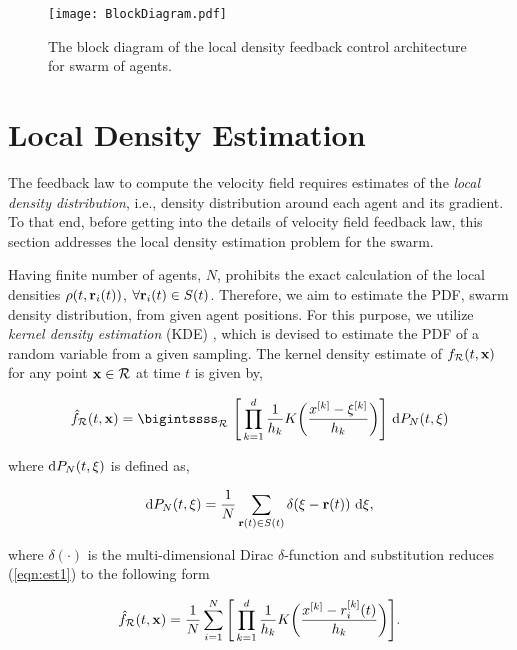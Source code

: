 \documentclass{ifacconf}
\newcommand{\Rconf}{{\mathcal R}}
\newcommand{\bx}{{\bf x}}
\newcommand{\br}{{\bf r}}
\begin{document}
\begin{figure}[hbt!]
\centering
\texttt{[image: BlockDiagram.pdf]}
\caption{The block diagram of the local density feedback control architecture for swarm of agents.} 
\label{fig: blockdiagfeedback}
\end{figure}


\section{Local Density Estimation}%
The feedback  law to compute the velocity field requires  estimates of the \emph{local density distribution}, i.e., density distribution around each agent and its gradient.  To that end, before getting into the details of velocity field feedback law, this section addresses the local density estimation problem for the swarm. 

Having finite number of agents, $N$, prohibits the exact calculation of the local densities $\rho(t,\br_i(t))$, $\forall\br_i(t) \in S(t)$. Therefore, we aim to estimate the PDF, swarm density distribution, from given agent positions. For this purpose, we utilize   \emph{kernel density estimation} (KDE) \cite{rosenblatt1956remarks,parzen1962estimation}, which is devised to estimate the PDF of a random variable from a given sampling. The kernel density estimate of $f_\Rconf(t,\bx)$ for any point $\bx \in \Rconf$ at time $t$ is given by, 

\begin{equation}\label{eqn:est1}
	\hat{f}_\Rconf(t,\bx) = \bigintssss_{\Rconf} \ \Bigg[ \prod_{k=1}^{d} \frac{1}{h_k}K\bigg(\frac{x^{[k]}-\xi^{[k]}}{h_k}\bigg) \Bigg] \ \textnormal{d}P_N(t,\textbf{$\xi$})
\end{equation}

where $\textnormal{d}P_N(t,\textbf{$\xi$})$  is defined as,

\begin{equation*}
	\textnormal{d}P_N(t,\textbf{$\xi$}) = \frac{1}{N}\sum_{\br(t) \in S(t)} \delta(\textbf{$\xi$}-\br (t)) \ \textnormal{d}\xi,
\end{equation*}

where $\delta(\cdot)$ is the multi-dimensional Dirac $\delta$-function and substitution reduces (\ref{eqn:est1}) to the following form

\begin{equation} \label{eqn:f_estimator}
	\hat{f}_\Rconf (t,\bx) = \frac{1}{N} \sum_{i = 1}^{N} \Bigg[\prod_{k=1}^{d} \frac{1}{h_k}K\bigg(\frac{x^{[k]}-r^{[k]}_i(t)}{h_k}\bigg)\Bigg].
\end{equation}
\end{document}
